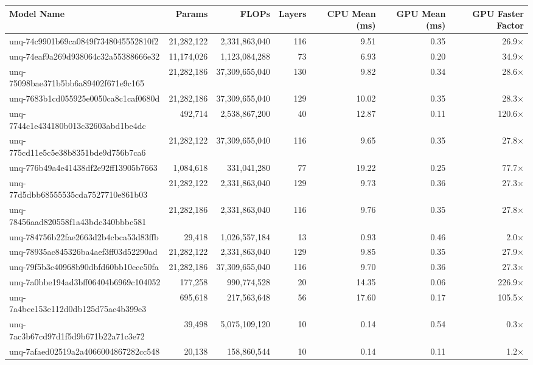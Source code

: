 \begin{table}[h!]
\centering
\fontsize{7}{9}\selectfont
\begin{tabular}{lrrrrrr}
\toprule
\textbf{Model Name} & \textbf{Params} & \textbf{FLOPs} & \textbf{Layers} & \textbf{CPU Mean (ms)} & \textbf{GPU Mean (ms)} & \textbf{GPU Faster Factor} \\
\midrule
unq-74c9901b69ca0849f7348045552810f2 & 21,282,122 & 2,331,863,040 & 116 & 9.51 & 0.35 & 26.9$\times$ \\
unq-74eaf9a269d938064c32a55388666e32 & 11,174,026 & 1,123,084,288 & 73 & 6.93 & 0.20 & 34.9$\times$ \\
unq-75098bae371b5bb6a89402f671e9c165 & 21,282,186 & 37,309,655,040 & 130 & 9.82 & 0.34 & 28.6$\times$ \\
unq-7683b1cd055925e0050ca8c1caf0680d & 21,282,186 & 37,309,655,040 & 129 & 10.02 & 0.35 & 28.3$\times$ \\
unq-7744c1e434180b013c32603abd1be4dc & 492,714 & 2,538,867,200 & 40 & 12.87 & 0.11 & 120.6$\times$ \\
unq-775cd11e5c5e38b8351bde9d756b7ca6 & 21,282,122 & 37,309,655,040 & 116 & 9.65 & 0.35 & 27.8$\times$ \\
unq-776b49a4e41438df2e92ff13905b7663 & 1,084,618 & 331,041,280 & 77 & 19.22 & 0.25 & 77.7$\times$ \\
unq-77d5dbb68555535cda7527710e861b03 & 21,282,122 & 2,331,863,040 & 129 & 9.73 & 0.36 & 27.3$\times$ \\
unq-78456aad820558f1a43bdc340bbbc581 & 21,282,186 & 2,331,863,040 & 116 & 9.76 & 0.35 & 27.8$\times$ \\
unq-784756b22fae2663d2b4cbca53d83ffb & 29,418 & 1,026,557,184 & 13 & 0.93 & 0.46 & 2.0$\times$ \\
unq-78935ac845326ba4aef3ff03d52290ad & 21,282,122 & 2,331,863,040 & 129 & 9.85 & 0.35 & 27.9$\times$ \\
unq-79f5b3c40968b90dbfd60bb10ccc50fa & 21,282,186 & 37,309,655,040 & 116 & 9.70 & 0.36 & 27.3$\times$ \\
unq-7a0bbe194ad3bff06404b6969c104052 & 177,258 & 990,774,528 & 20 & 14.35 & 0.06 & 226.9$\times$ \\
unq-7a4bce153e112d0db125d75ac4b399e3 & 695,618 & 217,563,648 & 56 & 17.60 & 0.17 & 105.5$\times$ \\
unq-7ac3b67cd97d1f5d9b671b22a71c3e72 & 39,498 & 5,075,109,120 & 10 & 0.14 & 0.54 & 0.3$\times$ \\
unq-7afaed02519a2a4066004867282cc548 & 20,138 & 158,860,544 & 10 & 0.14 & 0.11 & 1.2$\times$ \\

\end{tabular}
\end{table}
